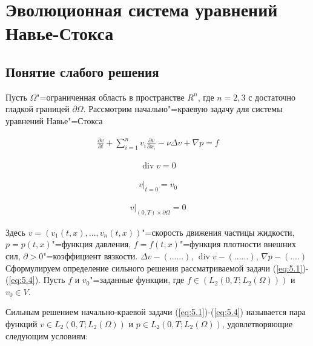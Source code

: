 \section{Эволюционная система уравнений \\Навье-Стокса}
\subsection {Понятие слабого решения}
Пусть $\Omega$"=ограниченная область в пространстве $R^n$, где $n=2,3$ с достаточно гладкой границей $\partial\Omega$. Рассмотрим начально"=краевую задачу для системы уравнений Навье"=Стокса

\begin{equation}\label{eq:5.1}
    \begin{gathered}
        \frac{\partial v}{\partial t}+\sum_{i=1}^nv_i\frac{\partial v}{\partial x_i}-\nu\Delta v+\nabla p=f
    \end{gathered}
\end{equation}

\begin{equation}\label{eq:5.2}
    \begin{gathered}
        \operatorname{div} v=0
    \end{gathered}
\end{equation}

\begin{equation}\label{eq:5.3}
    \begin{gathered}
        v|_{t=0}=v_0
    \end{gathered}
\end{equation}

\begin{equation}\label{eq:5.4}
    \begin{gathered}
        v|_{(0,T)\times\partial\Omega}=0
    \end{gathered}
\end{equation}

Здесь $v=(v_1(t,x),...,v_n(t,x))$"=скорость движения частицы жидкости, $p=p(t,x)$"=функция давления,
$f=f(t,x)$"=функция плотности внешних сил, $\partial>0$"=коэффициент вязкости. $\Delta v- (......)$,
$\operatorname{div} v- (......)$, $\nabla p- (....)$
Сформулируем определение сильного решения рассматриваемой задачи (\ref{eq:5.1})-(\ref{eq:5.4}). Пусть $f$ и $v_0$"=заданные функции,
где $f\in (L_2(0,T;L_2(\Omega)))$ и $v_0\in V$.

\begin{definition}
    Сильным решением начально-краевой задачи (\ref{eq:5.1})-(\ref{eq:5.4}) называется пара функций $v\in L_2(0,T;L_2(\Omega))$ и
    $p\in L_2(0,T;L_2(\Omega))$, удовлетворяющие следующим условиям:
\end{definition}

